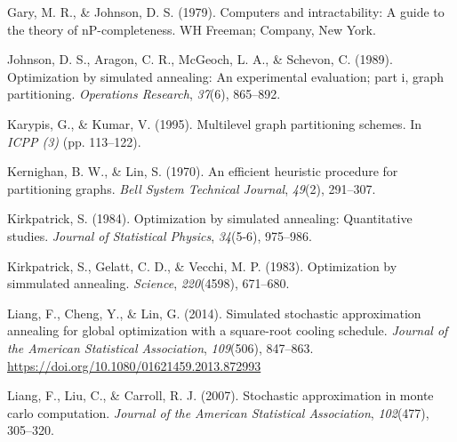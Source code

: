 \documentclass[11pt,]{article}
\begin{document}
\setlength{\parindent}{0em} \setlength{\parskip}{1pc}

\hypertarget{refs}{}
\hypertarget{ref-gar79}{}
Gary, M. R., \& Johnson, D. S. (1979). Computers and intractability: A
guide to the theory of nP-completeness. WH Freeman; Company, New York.

\hypertarget{ref-joh89}{}
Johnson, D. S., Aragon, C. R., McGeoch, L. A., \& Schevon, C. (1989).
Optimization by simulated annealing: An experimental evaluation; part i,
graph partitioning. \emph{Operations Research}, \emph{37}(6), 865--892.

\hypertarget{ref-kar95}{}
Karypis, G., \& Kumar, V. (1995). Multilevel graph partitioning schemes.
In \emph{ICPP (3)} (pp. 113--122).

\hypertarget{ref-ker70}{}
Kernighan, B. W., \& Lin, S. (1970). An efficient heuristic procedure
for partitioning graphs. \emph{Bell System Technical Journal},
\emph{49}(2), 291--307.

\hypertarget{ref-kir84}{}
Kirkpatrick, S. (1984). Optimization by simulated annealing:
Quantitative studies. \emph{Journal of Statistical Physics},
\emph{34}(5-6), 975--986.

\hypertarget{ref-kir83}{}
Kirkpatrick, S., Gelatt, C. D., \& Vecchi, M. P. (1983). Optimization by
simmulated annealing. \emph{Science}, \emph{220}(4598), 671--680.

\hypertarget{ref-lia14}{}
Liang, F., Cheng, Y., \& Lin, G. (2014). Simulated stochastic
approximation annealing for global optimization with a square-root
cooling schedule. \emph{Journal of the American Statistical
Association}, \emph{109}(506), 847--863.
\url{https://doi.org/10.1080/01621459.2013.872993}

\hypertarget{ref-lia07}{}
Liang, F., Liu, C., \& Carroll, R. J. (2007). Stochastic approximation
in monte carlo computation. \emph{Journal of the American Statistical
Association}, \emph{102}(477), 305--320.
\end{document}

